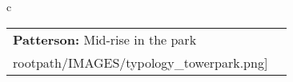 \begin{table}[H]
        \begin{tabular}{c}
        \begin{tabular}{m{1.5in} m{2in}}
\textbf{Patterson:} {Mid-rise in the park} & \texttt{[image: \\rootpath/IMAGES/typology\_towerpark.png]}
\end{tabular}\end{tabular}
        \end{table}